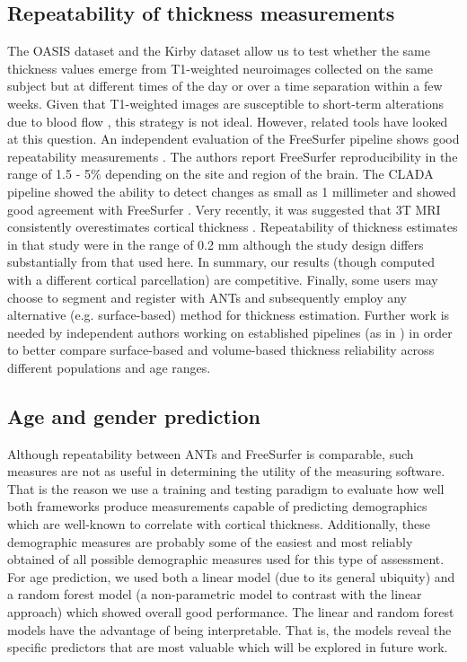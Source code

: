 \subsection{Repeatability of thickness measurements}
The OASIS dataset and the Kirby dataset allow us to test whether the same
thickness values emerge from T1-weighted
neuroimages collected on the same subject but at different times of
the day or over a time separation within a few weeks.  Given that
T1-weighted images are susceptible to short-term alterations due to
blood flow \cite{Franklin2013,Salgado-Pineda2006,Yamasue2007}, this strategy is not ideal.  However, related
tools have looked at this question. An independent evaluation of the FreeSurfer pipeline shows good
repeatability measurements \cite{jovicich2013}. The authors report
FreeSurfer reproducibility in the range of 1.5 - 5\% depending on the
site and region of the brain.  The CLADA pipeline showed the ability to detect
changes as small as 1 millimeter and showed good agreement with
FreeSurfer \cite{nakamura2011}. Very recently, it was suggested that 3T MRI
consistently overestimates cortical thickness \cite{lusebrink2013}.
Repeatability of thickness estimates in that study were in the range
of 0.2 mm although the study design differs substantially from that used here.
In summary, our results (though computed
with a different cortical parcellation) are competitive.  
Finally, some users may choose to segment and register
with ANTs and subsequently employ any alternative (e.g. surface-based)
method for thickness estimation.  Further work is needed by
independent authors working on established pipelines (as in \cite{lusebrink2013,jovicich2013}) in order to
better compare surface-based and volume-based thickness reliability
across different populations and age ranges. 

\subsection{Age and gender prediction} 
Although repeatability between ANTs and FreeSurfer is comparable,
such measures are not as useful in determining the utility of the 
measuring software.  That is the reason we use a training and testing 
paradigm to evaluate how well both frameworks produce measurements 
capable of predicting demographics which are well-known to correlate
with cortical thickness.  Additionally, these demographic measures are
probably some of the easiest and most reliably obtained of all possible
demographic measures used for this type of assessment.  For age prediction,
we used both a linear model (due to its general ubiquity) and a random
forest model (a non-parametric model to contrast with the linear approach)
which showed overall good performance.  The linear  and
random forest models have the advantage of being
interpretable.  That is, the models reveal the specific predictors
that are most valuable which will be explored in future work.  

